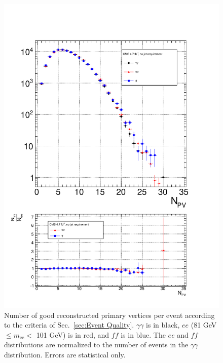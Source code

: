 \documentclass[dissertation.tex]{subfiles}
\begin{document}
\begin{figure}
	\centering
	\includegraphics[scale=0.5]{hadronic_activity_nPV}
	\caption{Number of good reconstructed primary vertices per event according to the criteria of Sec.~\ref{sec:Event Quality}.  $\gamma\gamma$ is in black, $ee$ (81 GeV $\leq m_{\mathrm{ee}} <$ 101 GeV) is in red, and $\mathit{ff}$ is in blue.  The $ee$ and $\mathit{ff}$ distributions are normalized to the number of events in the $\gamma\gamma$ distribution.  Errors are statistical only.}
	\label{fig:hadronic_activity_nPV}
\end{figure}
\end{document}
